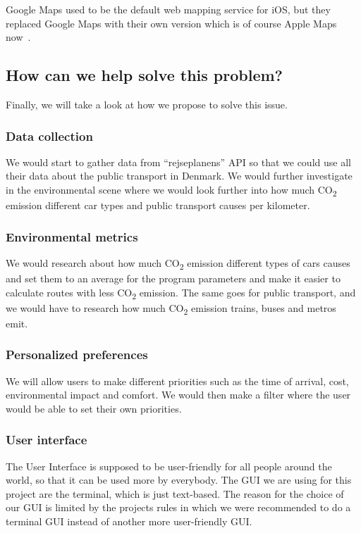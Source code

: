 Google Maps used to be the default web mapping service for iOS, but they replaced Google Maps with their own version
which is of course Apple Maps now~\cite{applemaps2023}.

\subsection{How can we help solve this problem?}\label{subsec:how-can-we-help-solve-this-problem?}

Finally, we will take a look at how we propose to solve this issue.

\subsubsection{Data collection}

We would start to gather data from ``rejseplanens'' API so that we could use all their data about the public transport
in Denmark.
We would further investigate in the environmental scene where we would look further into how much \unit{CO_{2}} emission
different car types and public transport causes per kilometer.

\subsubsection{Environmental metrics}

We would research about how much \unit{CO_{2}} emission different types of cars causes and set them to an average for
the program parameters and make it easier to calculate routes with less \unit{CO_{2}} emission.
The same goes for public transport, and we would have to research how much \unit{CO_{2}} emission trains, buses and
metros emit.

\subsubsection{Personalized preferences}

We will allow users to make different priorities such as the time of arrival, cost, environmental impact and comfort.
We would then make a filter where the user would be able to set their own priorities.

\subsubsection{User interface}

The User Interface is supposed to be user-friendly for all people around the world, so that it can be used more by
everybody.
The GUI we are using for this project are the terminal, which is just text-based.
The reason for the choice of our GUI is limited by the projects rules in which we were recommended to do a terminal GUI
instead of another more user-friendly GUI\@.

